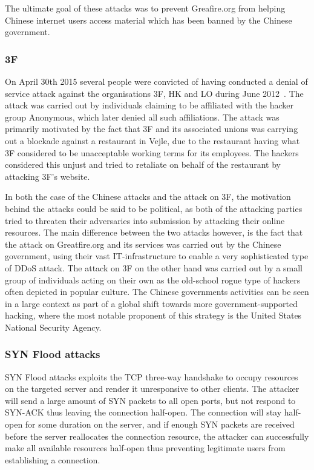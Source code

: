 \documentclass[12pt]{article}
\begin{document}
The ultimate goal of these attacks was to prevent Greafire.org from helping Chinese internet users access material which has been banned by the Chinese government.

\subsubsection{3F}

On April 30th 2015 several people were convicted of having conducted a denial of service attack against the organisations 3F, HK and LO during June 2012~\cite{hackere-3f}.
The attack was carried out by individuals claiming to be affiliated with the hacker group Anonymous, which later denied all such affiliations. The attack was primarily motivated by the fact that 3F and its associated unions was carrying out a blockade against a restaurant in Vejle, due to the restaurant having what 3F considered to be unacceptable working terms for its employees. The hackers considered this unjust and tried to retaliate on behalf of the restaurant by attacking 3F's website.

In both the case of the Chinese attacks and the attack on 3F, the motivation behind the attacks could be said to be political, as both of the attacking parties tried to threaten their adversaries into submission by attacking their online resources.
The main difference between the two attacks however, is the fact that the attack on Greatfire.org and its services was carried out by the Chinese government, using their vast IT-infrastructure to enable a very sophisticated type of DDoS attack. The attack on 3F on the other hand was carried out by a small group of individuals acting on their own as the old-school rogue type of hackers often depicted in popular culture. The Chinese governments activities can be seen in a large context as part of a global shift towards more government-supported hacking, where the most notable proponent of this strategy is the United States National Security Agency.

\subsubsection{SYN Flood attacks}

SYN Flood attacks exploits the TCP three-way handshake to occupy resources on the targeted server and render it unresponsive to other clients. The attacker will send a large amount of SYN packets to all open ports, but not respond to SYN-ACK thus leaving the connection half-open. The connection will stay half-open for some duration on the server, and if enough SYN packets are received before the server reallocates the connection resource, the attacker can successfully make all available resources half-open thus preventing legitimate users from establishing a connection.
\end{document}
